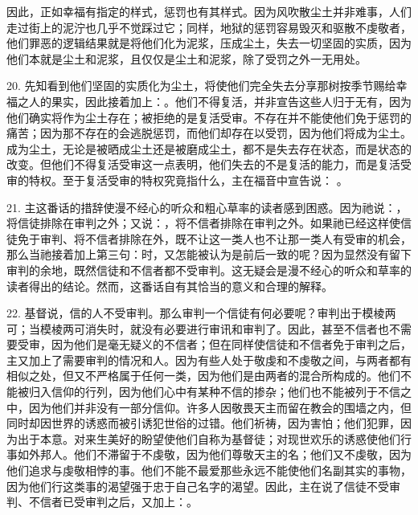 因此，正如幸福有指定的样式，惩罚也有其样式。因为风吹散尘土并非难事，人们走过街上的泥泞也几乎不觉踩过它；同样，地狱的惩罚容易毁灭和驱散不虔敬者，他们罪恶的逻辑结果就是将他们化为泥浆，压成尘土，失去一切坚固的实质，因为他们本就是尘土和泥浆，且仅仅是尘土和泥浆，除了受罚之外一无用处。\par

20. 先知看到他们坚固的实质化为尘土，将使他们完全失去分享那树按季节赐给幸福之人的果实，因此接着加上：。他们不得复活，并非宣告这些人归于无有，因为他们确实将作为尘土存在；被拒绝的是复活受审。不存在并不能使他们免于惩罚的痛苦；因为那不存在的会逃脱惩罚，而他们却存在以受罚，因为他们将成为尘土。成为尘土，无论是被晒成尘土还是被磨成尘土，都不是失去存在状态，而是状态的改变。但他们不得复活受审这一点表明，他们失去的不是复活的能力，而是复活受审的特权。至于复活受审的特权究竟指什么，主在福音中宣告说： 。\par

21. 主这番话的措辞使漫不经心的听众和粗心草率的读者感到困惑。因为祂说：，将信徒排除在审判之外；又说：，将不信者排除在审判之外。如果祂已经这样使信徒免于审判、将不信者排除在外，既不让这一类人也不让那一类人有受审的机会，那么当祂接着加上第三句：时，又怎能被认为是前后一致的呢？因为显然没有留下审判的余地，既然信徒和不信者都不受审判。这无疑会是漫不经心的听众和草率的读者得出的结论。然而，这番话自有其恰当的意义和合理的解释。\par

22. 基督说，信的人不受审判。那么审判一个信徒有何必要呢？审判出于模棱两可；当模棱两可消失时，就没有必要进行审讯和审判了。因此，甚至不信者也不需要受审，因为他们是毫无疑义的不信者；但在同样使信徒和不信者免于审判之后，主又加上了需要审判的情况和人。因为有些人处于敬虔和不虔敬之间，与两者都有相似之处，但又不严格属于任何一类，因为他们是由两者的混合所构成的。他们不能被归入信仰的行列，因为他们心中有某种不信的掺杂；他们也不能被列于不信之中，因为他们并非没有一部分信仰。许多人因敬畏天主而留在教会的围墙之内，但同时却因世界的诱惑而被引诱犯世俗的过错。他们祈祷，因为害怕；他们犯罪，因为出于本意。对来生美好的盼望使他们自称为基督徒；对现世欢乐的诱惑使他们行事如外邦人。他们不滞留于不虔敬，因为他们尊敬天主的名；他们又不虔敬，因为他们追求与虔敬相悖的事。他们不能不最爱那些永远不能使他们名副其实的事物，因为他们行这类事的渴望强于忠于自己名字的渴望。因此，主在说了信徒不受审判、不信者已受审判之后，又加上：。\par

